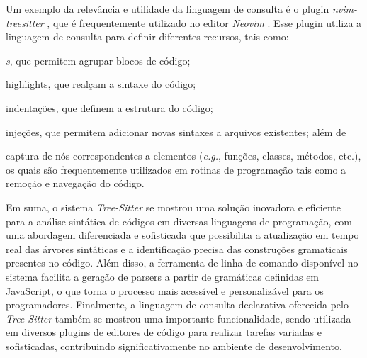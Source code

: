 \documentclass[11pt, a4paper, english, openright, twoside, brazil]{abntex2}
\begin{document}
Um exemplo da relevância e utilidade da linguagem de consulta é o plugin
\textit{nvim-treesitter} \cite{nvim-treesitter-2023-nvim}, que é frequentemente
utilizado no editor \textit{Neovim} \cite{neovim-2014-hyperextensible}. Esse
plugin utiliza a linguagem de consulta para definir diferentes recursos, tais
como:
\begin{inparaenum}
  \item \textit{s}, que permitem agrupar blocos de código;
  \item highlights, que realçam a sintaxe do código;
  \item indentações, que definem a estrutura do código;
  \item injeções, que permitem adicionar novas sintaxes a arquivos existentes;
        além de
  \item captura de nós correspondentes a elementos (\textit{e.g.}, funções,
        classes, métodos, etc.), os quais são frequentemente utilizados em
        rotinas de programação tais como a remoção e navegação do código.
\end{inparaenum}

Em suma, o sistema \textit{Tree-Sitter} se mostrou uma solução inovadora e
eficiente para a análise sintática de códigos em diversas linguagens de
programação, com uma abordagem diferenciada e sofisticada que possibilita a
atualização em tempo real das árvores sintáticas e a identificação precisa das
construções gramaticais presentes no código. Além disso, a ferramenta de linha
de comando disponível no sistema facilita a geração de parsers a partir de
gramáticas definidas em JavaScript, o que torna o processo mais acessível e
personalizável para os programadores. Finalmente, a linguagem de consulta
declarativa oferecida pelo \textit{Tree-Sitter} também se mostrou uma
importante funcionalidade, sendo utilizada em diversos plugins de editores de
código para realizar tarefas variadas e sofisticadas, contribuindo
significativamente no ambiente de desenvolvimento.


\postextual
\printbibliography
{}
\end{document}
